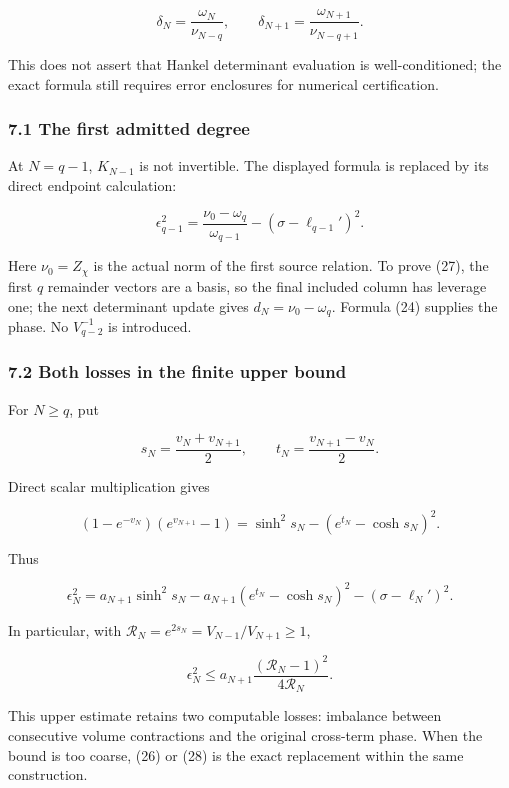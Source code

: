 \[
\delta_N=\frac{\omega_N}{\nu_{N-q}},\qquad
\delta_{N+1}=\frac{\omega_{N+1}}{\nu_{N-q+1}}.
\]

This does not assert that Hankel determinant evaluation is
well-conditioned; the exact formula still requires error enclosures for
numerical certification.

\subsubsection{7.1 The first admitted
degree}\label{toda_volume:the-first-admitted-degree}

At \(N=q-1\), \(K_{N-1}\) is not invertible. The displayed formula is
replaced by its direct endpoint calculation:

\[
\boxed{
\epsilon_{q-1}^2
=\frac{\nu_0-\omega_q}{\omega_{q-1}}
-(\sigma-\ell_{q-1}')^2.
}
\tag{27}
\]

Here \(\nu_0=Z_\chi\) is the actual norm of the first source relation.
To prove (27), the first \(q\) remainder vectors are a basis, so the
final included column has leverage one; the next determinant update
gives \(d_N=\nu_0-\omega_q\). Formula (24) supplies the phase. No
\(V_{q-2}^{-1}\) is introduced.

\subsubsection{7.2 Both losses in the finite upper
bound}\label{toda_volume:both-losses-in-the-finite-upper-bound}

For \(N\ge q\), put

\[
s_N=\frac{v_N+v_{N+1}}2,\qquad t_N=\frac{v_{N+1}-v_N}2.
\]

Direct scalar multiplication gives

\[
(1-e^{-v_N})(e^{v_{N+1}}-1)
=\sinh^2s_N-(e^{t_N}-\cosh s_N)^2.
\]

Thus

\[
\boxed{
\epsilon_N^2=a_{N+1}\sinh^2s_N
-a_{N+1}(e^{t_N}-\cosh s_N)^2
-(\sigma-\ell_N')^2.
}
\tag{28}
\]

In particular, with \(\mathcal R_N=e^{2s_N}=V_{N-1}/V_{N+1}\ge1\),

\[
\boxed{
\epsilon_N^2\le a_{N+1}\frac{(\mathcal R_N-1)^2}{4\mathcal R_N}.
}
\tag{29}
\]

This upper estimate retains two computable losses: imbalance between
consecutive volume contractions and the original cross-term phase. When
the bound is too coarse, (26) or (28) is the exact replacement within
the same construction.

